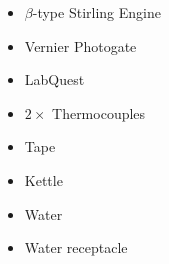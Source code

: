 \documentclass{article}
\begin{document}
\begin{minipage}{0.45\textwidth}
\begin{itemize}
    \item $\beta$-type Stirling Engine
    \item Vernier Photogate
    \item LabQuest
    \item $2\times$ Thermocouples
\end{itemize}
\end{minipage}
\begin{minipage}{0.45\textwidth}
\begin{itemize}
    \item Tape
    \item Kettle
    \item Water
    \item Water receptacle
\end{itemize}
\end{minipage}
\end{document}
